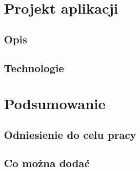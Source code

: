 \documentclass[paper=a4, fontsize=11pt]{scrartcl} %
\numberwithin{equation}{section} %
\numberwithin{figure}{section} %
\begin{document}
\section{Projekt aplikacji} %
\subsection{Opis}
\subsection{Technologie}
\newpage
\section{Podsumowanie} %
\subsection{Odniesienie do celu pracy}
\subsection{Co można dodać}

\newpage
\nocite{*}
\printbibliography
\end{document}
